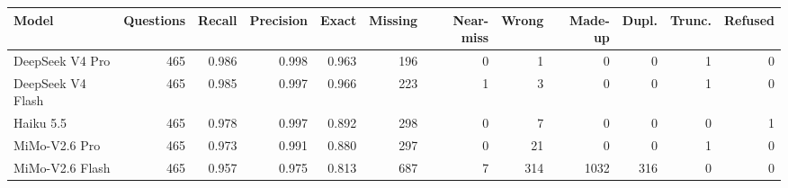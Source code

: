 \begin{tabular}{lrrrrrrrrrrr}
\toprule
Model & Questions & Recall & Precision & Exact & Missing & Near-miss & Wrong & Made-up & Dupl. & Trunc. & Refused \\
\midrule
DeepSeek V4 Pro & 465 & 0.986 & 0.998 & 0.963 & 196 & 0 & 1 & 0 & 0 & 1 & 0 \\
DeepSeek V4 Flash & 465 & 0.985 & 0.997 & 0.966 & 223 & 1 & 3 & 0 & 0 & 1 & 0 \\
Haiku 5.5 & 465 & 0.978 & 0.997 & 0.892 & 298 & 0 & 7 & 0 & 0 & 0 & 1 \\
MiMo-V2.6 Pro & 465 & 0.973 & 0.991 & 0.880 & 297 & 0 & 21 & 0 & 0 & 1 & 0 \\
MiMo-V2.6 Flash & 465 & 0.957 & 0.975 & 0.813 & 687 & 7 & 314 & 1032 & 316 & 0 & 0 \\
\bottomrule
\end{tabular}
